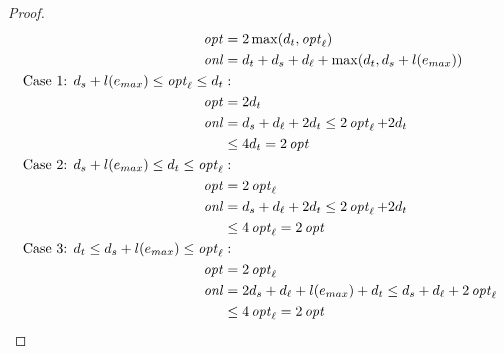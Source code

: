 \begin{proof}
\begin{align*}
    \small
    \opt &= 2\max(d_t, \opt_\ell)\\
    \onl &= d_t + d_s + d_\ell + \max(d_t, d_s + l(e_{max}))\\ 
    \text{Case 1: } d_s + l(e_{max}) \leq \opt_\ell \leq d_t&:\\
    \opt &= 2d_t\\
    \onl &= d_s+d_\ell+2d_t \leq 2\opt_\ell + 2d_t\\ 
    &\leq 4d_t = 2\opt\\
    \text{Case 2: } d_s + l(e_{max}) \leq d_t \leq \opt_\ell&:\\
    \opt &= 2\opt_\ell\\
    \onl &= d_s + d_\ell + 2d_t \leq 2\opt_\ell + 2d_t\\
    &\leq 4\opt_\ell = 2\opt\\
    \text{Case 3: } d_t \leq d_s + l(e_{max}) \leq \opt_\ell&:\\
    \opt &= 2\opt_\ell\\
    \onl &= 2d_s + d_\ell + l(e_{max}) + d_t \leq d_s + d_\ell + 2\opt_\ell\\
    &\leq 4\opt_\ell = 2\opt
\end{align*}


\end{proof}
